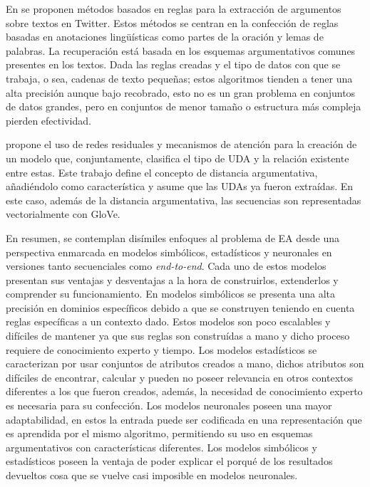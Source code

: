 \documentclass[a4paper,11pt,twocolumn,twoside]{article}
\begin{document}
En \cite{dykes2020reconstructing} se proponen métodos basados en reglas para la extracción de argumentos sobre
textos en Twitter. Estos métodos se centran en la confección de reglas basadas en anotaciones lingüísticas como
partes de la oración y lemas de palabras. La recuperación está basada en los esquemas argumentativos comunes presentes
en los textos. Dada las reglas creadas y el tipo
de datos con que se trabaja, o sea, cadenas de texto pequeñas; estos algoritmos tienden a tener una alta precisión aunque 
bajo recobrado, esto no es un gran problema en conjuntos de datos grandes, pero en conjuntos de menor tamaño o estructura 
más compleja pierden efectividad.

\cite{galassi2021deep} propone el uso de redes residuales y mecanismos de atención
para la creación de un modelo que, conjuntamente, clasifica el tipo de UDA y la relación existente entre estas.
Este trabajo define el concepto de distancia argumentativa, añadiéndolo como característica y asume que las UDAs ya fueron 
extraídas. En este caso, además de la distancia argumentativa, las secuencias son representadas 
vectorialmente con GloVe.

En resumen, se contemplan disímiles enfoques al problema de EA desde una perspectiva enmarcada en modelos 
simbólicos, estadísticos y neuronales en versiones tanto secuenciales como \textit{end-to-end}. 
Cada uno de estos modelos presentan sus ventajas y desventajas a la hora de construirlos, 
extenderlos y comprender su funcionamiento. En modelos simbólicos se presenta una alta
precisión en dominios específicos debido a que se construyen teniendo en cuenta reglas específicas a un
contexto dado. Estos modelos son poco escalables y difíciles de mantener ya que sus reglas son construídas
a mano y dicho proceso requiere de conocimiento experto y tiempo. Los modelos estadísticos 
se caracterizan por usar conjuntos de atributos creados a mano, dichos atributos son difíciles
de encontrar, calcular y pueden no poseer relevancia en otros contextos diferentes a los que fueron creados,
además, la necesidad de conocimiento experto es necesaria para su confección. Los modelos neuronales poseen
una mayor adaptabilidad, en estos la entrada puede ser codificada en una representación que es aprendida por
el mismo algoritmo, permitiendo su uso en esquemas argumentativos con características diferentes. Los modelos simbólicos y 
estadísticos poseen la ventaja de poder explicar el porqué de los resultados devueltos cosa que se vuelve casi
imposible en modelos neuronales.
\end{document}
